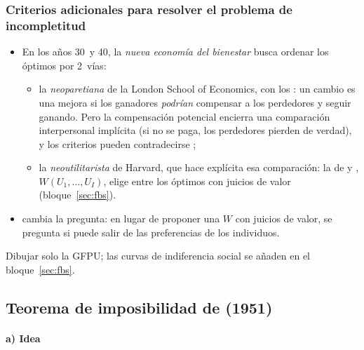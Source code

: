 \documentclass[11pt]{article}
\begin{document}
\subsubsection{Criterios adicionales para resolver el problema de incompletitud}\label{sec:criterios-adicionales}

\begin{itemize}
\item En los años 30~y 40, la \emph{nueva economía del bienestar} busca ordenar los óptimos por 2~vías:
  \begin{itemize}
  \item la \emph{neoparetiana} de la London School of Economics, con los : un cambio es una mejora si los ganadores \emph{podrían} compensar a los perdedores y seguir ganando\nocite{Kaldor1939Welfare,Hicks1939Foundations}. Pero la compensación potencial encierra una comparación interpersonal implícita (si no se paga, los perdedores pierden de verdad), y los criterios pueden contradecirse\nocite{Scitovsky1941Note} ;
  \item la \emph{neoutilitarista} de Harvard, que hace explícita esa comparación: la  de \textcite{Bergson1938Reformulation} y \textcite{Samuelson1947Foundations}, $W(U_1,\dots,U_I)$, elige entre los óptimos con juicios de valor (bloque~\ref{sec:fbs}).
  \end{itemize}
\item {} cambia la pregunta: en lugar de proponer una $W$ con juicios de valor, se pregunta si puede salir de las preferencias de los individuos.
\end{itemize}

\begin{notaopositor}
Dibujar solo la GFPU; las curvas de indiferencia social se añaden en el bloque~\ref{sec:fbs}.
\end{notaopositor}

\subsection{Teorema de imposibilidad de  (1951)}\label{sec:teorema-arrow}

\paragraph{a) Idea}
\end{document}
